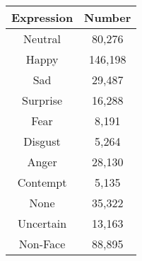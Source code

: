 \begin{tabular}{ |c|c| }
  \hline
  \toprule
  Expression & Number  \\
  \midrule
  Neutral    & 80,276  \\
  Happy      & 146,198 \\
  Sad        & 29,487  \\
  Surprise   & 16,288  \\
  Fear       & 8,191   \\
  Disgust    & 5,264   \\
  Anger      & 28,130  \\
  Contempt   & 5,135   \\
  None       & 35,322  \\
  Uncertain  & 13,163  \\
  Non-Face   & 88,895  \\
  \bottomrule
  \hline
\end{tabular}